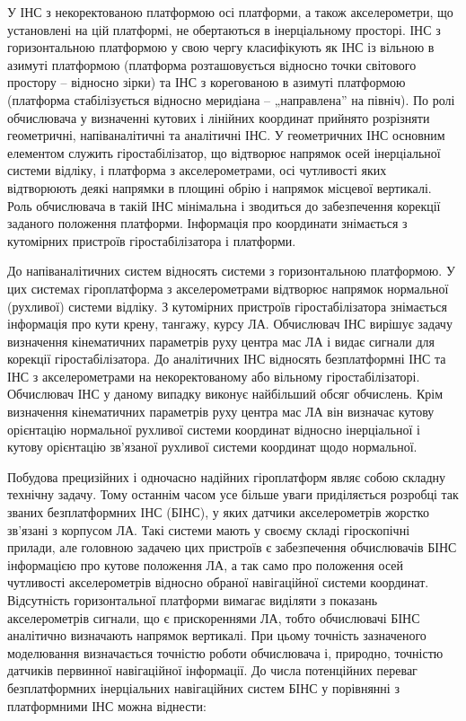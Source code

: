 У ІНС з некоректованою платформою осі платформи, а також акселерометри, що установлені на 
цій платформі, не обертаються в інерціальному просторі. 
ІНС з горизонтальною платформою у свою чергу класифікують як ІНС із вільною в 
азимуті платформою (платформа розташовується відносно точки світового простору – відносно зірки) 
та ІНС з корегованою в азимуті платформою (платформа стабілізується відносно меридіана – „направлена” на північ).
По ролі обчислювача у визначенні кутових і лінійних координат прийнято 
розрізняти геометричні, напіваналітичні та аналітичні ІНС. У геометричних ІНС 
основним елементом служить гіростабілізатор, що відтворює напрямок осей інерціальної 
системи відліку, і платформа з акселерометрами, осі чутливості яких відтворюють деякі 
напрямки в площині обрію і напрямок місцевої вертикалі. Роль обчислювача в такій ІНС 
мінімальна і зводиться до забезпечення корекції заданого положення платформи. Інформація 
про координати знімається з кутомірних пристроїв гіростабілізатора і платформи.

До напіваналітичних систем відносять системи з горизонтальною платформою. У 
цих системах гіроплатформа з акселерометрами відтворює напрямок нормальної (рухливої) 
системи відліку. З кутомірних пристроїв гіростабілізатора знімається інформація про 
кути крену, тангажу, курсу ЛА. Обчислювач ІНС вирішує задачу визначення кінематичних 
параметрів руху центра мас ЛА і видає сигнали для корекції гіростабілізатора.
До аналітичних ІНС відносять безплатформні ІНС та ІНС з акселерометрами на некоректованому 
або вільному гіростабілізаторі. Обчислювач ІНС у даному випадку виконує найбільший обсяг 
обчислень. Крім визначення кінематичних параметрів руху центра мас ЛА він визначає кутову 
орієнтацію нормальної рухливої системи координат відносно інерціальної і кутову орієнтацію 
зв'язаної рухливої системи координат щодо нормальної. 

Побудова прецизійних і одночасно надійних гіроплатформ являє собою складну технічну задачу. 
Тому останнім часом усе більше уваги приділяється розробці так званих безплатформних ІНС (БІНС), 
у яких датчики акселерометрів жорстко зв’язані з корпусом ЛА. Такі системи мають у своєму складі 
гіроскопічні прилади, але головною задачею цих пристроїв є забезпечення обчислювачів БІНС 
інформацією про кутове положення ЛА, а так само про положення осей чутливості акселерометрів 
відносно обраної навігаційної системи координат. Відсутність горизонтальної платформи вимагає 
виділяти з показань акселерометрів сигнали, що є прискореннями ЛА, тобто обчислювачі БІНС 
аналітично визначають напрямок вертикалі. При цьому точність зазначеного моделювання 
визначається точністю роботи обчислювача і, природно, точністю датчиків первинної навігаційної інформації.
До числа потенційних переваг безплатформних інерціальних навігаційних систем БІНС у 
порівнянні з платформними ІНС можна віднести:

